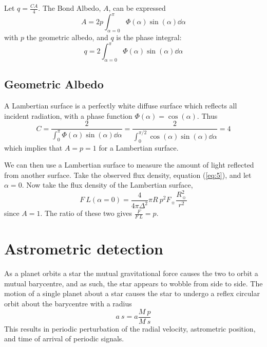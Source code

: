 Let $q = \frac{CA}{4}$. The Bond Albedo, $A$, can be expressed
\begin{equation}
  \label{eq:6}
  A = 2 p \int_{\alpha=0}^{\pi} \Phi(\alpha) \sin(\alpha) \dd{\alpha}
\end{equation}
with $p$ the geometric albedo, and $q$ is the phase integral:
\begin{equation}
  \label{eq:7}
  q = 2 \int_{\alpha=0}^{\pi} \Phi(\alpha) \sin(\alpha) \dd{\alpha}
\end{equation}

\subsection{Geometric Albedo}
\label{sec:geometric-albedo-1}

A Lambertian surface is a perfectly white diffuse surface which
reflects all incident radiation, with a phase function $\Phi(\alpha) =
\cos(\alpha)$. Thus
\begin{equation}
  \label{eq:8}
  C = \frac{2}{\int_0^{\pi} \Phi(\alpha) \sin(\alpha) \dd{\alpha}} 
    = \frac{2}{\int_0^{\pi/2} \cos(\alpha) \sin(\alpha)  \dd{\alpha} } = 4
\end{equation}
which implies that $A = p = 1$ for a Lambertian surface.

We can then use a Lambertian surface to measure the amount of light
reflected from another surface.  Take the observed flux density,
equation (\ref{eq:5}), and let $\alpha=0$. Now take the flux density
of the Lambertian surface,
\begin{equation}
  \label{eq:9}
  F~L(\alpha=0) = \frac{4}{4 \pi \Delta^2} \pi R~p^2 F_{\sun} \frac{R_{\sun}^2}{r^2} 
\end{equation}
since $A=1$. The ratio of these two gives $\frac{F}{F~L} = p$.

\section{Astrometric detection}
\label{sec:astr-detect}

As a planet orbits a star the mutual gravitational force causes the
two to orbit a mutual barycentre, and as such, the star appears to
wobble from side to side. The motion of a single planet about a star
causes the star to undergo a reflex circular orbit about the
barycentre with a radius
\[ a~s = a \frac{M~p}{M~s} \] This results in periodic perturbation of
the radial velocity, astrometric position, and time of arrival of
periodic signals.

